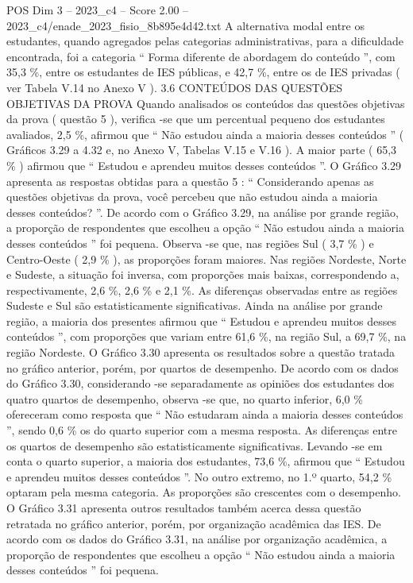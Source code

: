 \begin{textsample}{POS Dim 3 – 2023\_c4 – Score 2.00 – 2023\_c4/enade\_2023\_fisio\_8b895e4d42.txt}
A alternativa modal entre os estudantes, quando agregados pelas categorias administrativas, para a dificuldade encontrada, foi a categoria “ Forma diferente de abordagem do conteúdo ”, com 35,3 \%, entre os estudantes de IES públicas, e 42,7 \%, entre os de IES privadas ( ver Tabela V.14 no Anexo V ). 3.6 CONTEÚDOS DAS QUESTÕES OBJETIVAS DA PROVA Quando analisados os conteúdos das questões objetivas da prova ( questão 5 ), verifica -se que um percentual pequeno dos estudantes avaliados, 2,5 \%, afirmou que “ Não estudou ainda a maioria desses conteúdos ” ( Gráficos 3.29 a 4.32 e, no Anexo V, Tabelas V.15 e V.16 ).
A maior parte ( 65,3 \% ) afirmou que “ Estudou e aprendeu muitos desses conteúdos ”.
O Gráfico 3.29 apresenta as respostas obtidas para a questão 5 : “ Considerando apenas as questões objetivas da prova, você percebeu que não estudou ainda a maioria desses conteúdos? ”.
De acordo com o Gráfico 3.29, na análise por grande região, a proporção de respondentes que escolheu a opção “ Não estudou ainda a maioria desses conteúdos ” foi pequena.
Observa -se que, nas regiões Sul ( 3,7 \% ) e Centro-Oeste ( 2,9 \% ), as proporções foram maiores.
Nas regiões Nordeste, Norte e Sudeste, a situação foi inversa, com proporções mais baixas, correspondendo a, respectivamente, 2,6 \%, 2,6 \% e 2,1 \%.
As diferenças observadas entre as regiões Sudeste e Sul são estatisticamente significativas.
Ainda na análise por grande região, a maioria dos presentes afirmou que “ Estudou e aprendeu muitos desses conteúdos ”, com proporções que variam entre 61,6 \%, na região Sul, a 69,7 \%, na região Nordeste.
O Gráfico 3.30 apresenta os resultados sobre a questão tratada no gráfico anterior, porém, por quartos de desempenho.
De acordo com os dados do Gráfico 3.30, considerando -se separadamente as opiniões dos estudantes dos quatro quartos de desempenho, observa -se que, no quarto inferior, 6,0 \% ofereceram como resposta que “ Não estudaram ainda a maioria desses conteúdos ”, sendo 0,6 \% os do quarto superior com a mesma resposta.
As diferenças entre os quartos de desempenho são estatisticamente significativas.
Levando -se em conta o quarto superior, a maioria dos estudantes, 73,6 \%, afirmou que “ Estudou e aprendeu muitos desses conteúdos ”.
No outro extremo, no 1.º quarto, 54,2 \% optaram pela mesma categoria.
As proporções são crescentes com o desempenho.
O Gráfico 3.31 apresenta outros resultados também acerca dessa questão retratada no gráfico anterior, porém, por organização acadêmica das IES.
De acordo com os dados do Gráfico 3.31, na análise por organização acadêmica, a proporção de respondentes que escolheu a opção “ Não estudou ainda a maioria desses conteúdos ” foi pequena.

\end{textsample}
